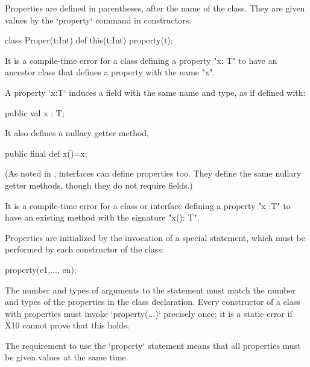 Properties are defined in parentheses, after the name of the class.  They are
given values by the \xcd`property` command in constructors.
\begin{xten}
class Proper(t:Int) {
  def this(t:Int) {property(t);}
}
\end{xten}
%




\begin{staticrule*}
It is a compile-time error for a class
defining a property \xcd"x: T" to have an ancestor class that defines
a property with the name \xcd"x".  
\end{staticrule*}

A property \xcd`x:T` induces a field with the same name and type, 
as if defined with: 
\begin{xten}
public val x : T;
\end{xten} 
\noindent It also defines a nullary getter method, 
\begin{xten}
public final def x()=x;
\end{xten}

\noindent (As noted in , interfaces can define
properties too. They define the same nullary getter methods, though they do
not require fields.)


\begin{staticrule*}
It is a compile-time error for a class or
interface defining a property \xcd"x :T" to have an existing method with
the signature \xcd"x(): T".
\end{staticrule*}


Properties are initialized by the invocation of a special 
statement, which must be performed by each constructor of the class:
\begin{xten}
property(e1,..., en);
\end{xten}
The number and types of arguments to the  statement must match
the number and types of the properties in the class declaration.  
Every constructor of a class with properties must invoke \xcd`property(...)`
precisely once; it is a static error if X10 cannot prove that this holds.

The requirement to use the \xcd`property` statement means that all properties
must be given values at the same time.  


